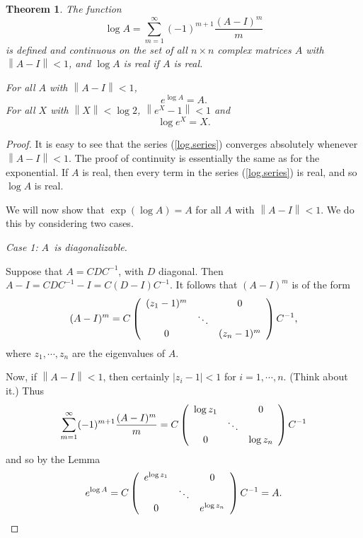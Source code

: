 \documentclass[12pt]{amsbook}
\theoremstyle{plain}
\newtheorem{theorem}{Theorem}
\numberwithin{equation}{chapter}
\numberwithin{theorem}{chapter}
\begin{document}
\begin{theorem}
\label{logarithm}The function
\begin{equation}
\log A=\sum_{m=1}^{\infty}(-1)^{m+1}\frac{(A-I)^{m}}{m}\label{log.series}%
\end{equation}
is defined and continuous on the set of all $n\times n$ complex matrices $A$
with $\left\|  A-I\right\|  <1$, and $\log A$ is real if $A$ is real.

For all $A$ with $\left\|  A-I\right\|  <1$,
\[
e^{\log A}=A\text{.}%
\]
For all $X$ with $\left\|  X\right\|  <\log2$, $\left\|  e^{X}-1\right\|  <1$
and
\[
\log e^{X}=X\text{.}%
\]
\end{theorem}

\begin{proof}
It is easy to see that the series (\ref{log.series}) converges absolutely
whenever $\left\|  A-I\right\|  <1$. The proof of continuity is essentially
the same as for the exponential. If $A$ is real, then every term in the series
(\ref{log.series}) is real, and so $\log A$ is real.

We will now show that $\exp(\log A)=A$ for all $A$ with $\left\|  A-I\right\|
<1$. We do this by considering two cases.

\textit{Case 1: }$A$\textit{\ is diagonalizable.}

Suppose that $A=CDC^{-1}$, with $D$ diagonal. Then $A-I=CDC^{-1}%
-I=C(D-I)C^{-1}$. It follows that $(A-I)^{m}$ is of the form
\[
(A-I)^{m}=C\left(
\begin{array}
[c]{ccc}%
(z_{1}-1)^{m} &  & 0\\
& \ddots & \\
0 &  & (z_{n}-1)^{m}%
\end{array}
\right)  C^{-1}\text{,}%
\]
where $z_{1},\cdots,z_{n}$ are the eigenvalues of $A$.

Now, if $\left\|  A-I\right\|  <1$, then certainly $\left|  z_{i}-1\right|
<1$ for $i=1,\cdots,n$. (Think about it.) Thus
\[
\sum_{m=1}^{\infty}(-1)^{m+1}\frac{(A-I)^{m}}{m}=C\left(
\begin{array}
[c]{ccc}%
\log z_{1} &  & 0\\
& \ddots & \\
0 &  & \log z_{n}%
\end{array}
\right)  C^{-1}%
\]
and so by the Lemma
\[
e^{\log A}=C\left(
\begin{array}
[c]{ccc}%
e^{\log z_{1}} &  & 0\\
& \ddots & \\
0 &  & e^{\log z_{n}}%
\end{array}
\right)  C^{-1}=A\text{.}%
\]


\end{proof}
\end{document}
